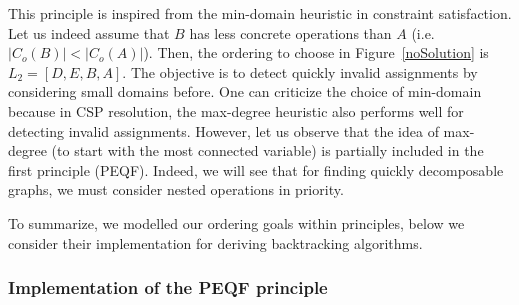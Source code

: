 \documentclass[a4paper]{article}
\begin{document}
This principle is inspired from the min-domain heuristic in constraint satisfaction. Let us indeed assume that 
$B$ has less concrete operations than $A$ (i.e. $|C_o(B)| < |C_o(A)|$). Then, the ordering to choose in Figure~\ref{noSolution} 
is $L_2 = [D, E, B, A]$.
The objective is to detect quickly invalid assignments by considering small domains before. One can 
criticize the choice of min-domain because in CSP resolution, the max-degree heuristic  
also performs well for detecting invalid assignments. However, let us observe that the idea of 
max-degree (to start with the most connected variable) is partially included in the first principle (PEQF). 
Indeed, we will see that for finding quickly decomposable graphs, we must consider nested operations in priority. 

To summarize, we modelled our ordering goals within principles, below we consider their implementation for deriving 
backtracking algorithms. 

\subsubsection{Implementation of the PEQF principle}
\end{document}

